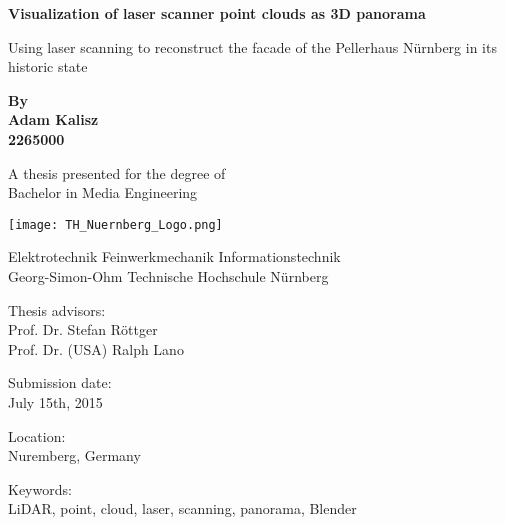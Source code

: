 \begin{titlepage}
	\begin{center}
		\vspace*{1cm}
		
		\Huge
		\textbf{Visualization of laser scanner point clouds as 3D panorama}
		
		\vspace{0.5cm}
		\Large
		Using laser scanning to reconstruct the facade of the Pellerhaus Nürnberg in its historic state
		
		\normalsize
		\vspace{1.5cm}
		
		\textbf{By}\\
		\vspace{0.5cm}
		\textbf{Adam Kalisz}\\
		\textbf{2265000}\\
		
		\vspace{1.5cm}
				
		
		A thesis presented for the degree of\\
		Bachelor in Media Engineering
		
		\vfill
		
		\vspace{0.8cm}
		
		{\texttt{[image: TH\_Nuernberg\_Logo.png]}}
		
		\Large
		\normalsize
		Elektrotechnik Feinwerkmechanik Informationstechnik\\
		Georg-Simon-Ohm Technische Hochschule Nürnberg\\
	
		\vfill
		
		\vspace{0.8cm}
		Thesis advisors:\\
		Prof. Dr. Stefan Röttger\\
		Prof. Dr. (USA) Ralph Lano\\	
		\vspace{0.8cm}
		
		Submission date:\\
		July 15th, 2015
		
		\vspace{0.8cm}
		
		Location:\\
		Nuremberg, Germany
		
		\vspace{0.8cm}
		
		Keywords:\\
		LiDAR, point, cloud, laser, scanning, panorama, Blender
		
		
		
		
	\end{center}
\end{titlepage}